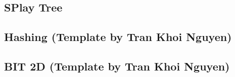 \subsection{SPlay Tree}
\raggedbottom
\hrulefill
\subsection{Hashing (Template by Tran Khoi Nguyen)}
\raggedbottom
\hrulefill
\subsection{BIT 2D (Template by Tran Khoi Nguyen)}
\raggedbottom
\hrulefill

